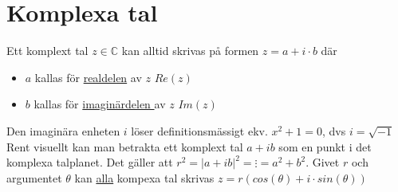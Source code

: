 \chapter{Komplexa tal}
Ett komplext tal $z\in\mathbb{C}$ kan alltid skrivas på formen $z=a+i\cdot b$ där\\
\begin{itemize}
    \item $a$ kallas för \underline{realdelen} av $z$ $Re(z)$
    \item $b$ kallas för \underline{imaginärdelen }av $z$ $Im(z)$
\end{itemize}

Den imaginära enheten $i$ löser definitionsmässigt ekv. $x^2+1=0$, dvs $i=\sqrt{-1}$
Rent visuellt kan man betrakta ett komplext tal $a + ib$ som en punkt i det komplexa talplanet.
Det gäller att $r^2= |a+ib|^2= \vdots =a^2+b^2$.
Givet $r$ och argumentet $\theta$ kan \underline{alla} kompexa tal skrivas $z=r(cos(\theta)+i\cdot sin(\theta))$
